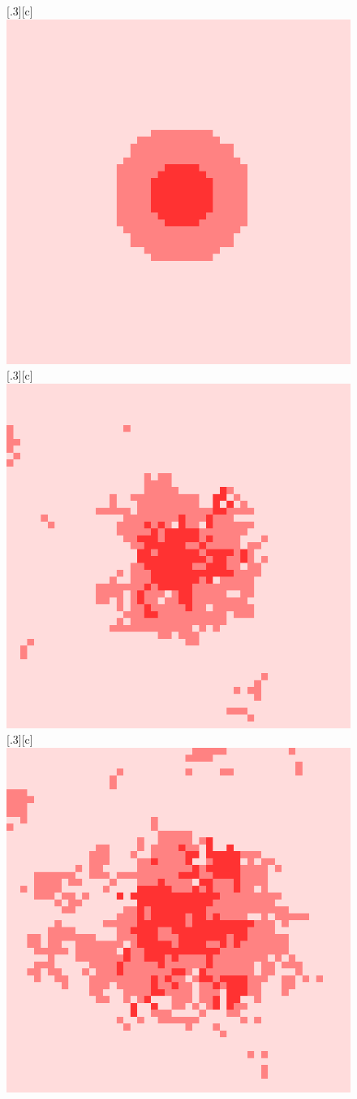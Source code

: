 \documentclass[10pt]{article}
\begin{document}
\begin{figure}[H]
  \centering
  [.3\linewidth][c]{
    \includegraphics[width=.3\linewidth]{images/sca_0.png}
  }
  [.3\linewidth][c]{
    \includegraphics[width=.3\linewidth]{images/sca_500.png}
  }
  [.3\linewidth][c]{
    \includegraphics[width=.3\linewidth]{images/sca_1000.png}
  }


\end{figure}
\end{document}
